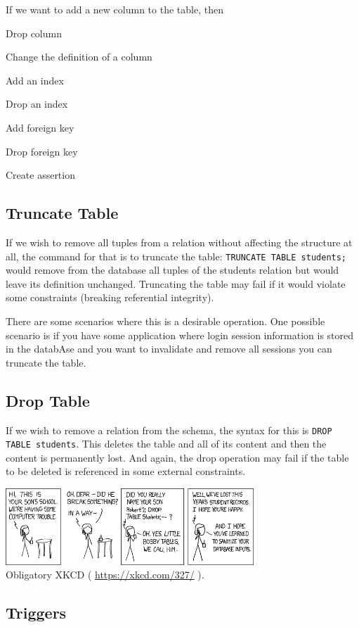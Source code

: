 If we want to add a new column to the table, then 

Drop column

Change the definition of a column

Add an index

Drop an index

Add foreign key

Drop foreign key

Create assertion 


\subsection*{Truncate Table}

If we wish to remove all tuples from a relation without affecting the structure at all, the command for that is to truncate the table: \texttt{TRUNCATE TABLE students;} would remove from the database all tuples of the students relation but would leave its definition unchanged. Truncating the table may fail if it would violate some constraints (breaking referential integrity).

There are some scenarios where this is a desirable operation. One possible scenario is if you have some application where login session information is stored in the databAse and you want to invalidate and remove all sessions you can truncate the table.

\subsection*{Drop Table}

If we wish to remove a relation from the schema, the syntax for this is \texttt{DROP TABLE students}. This deletes the table and all of its content and then the content is permanently lost. And again, the drop operation may fail if the table to be deleted is referenced in some external constraints.

\begin{center}
\includegraphics[width=0.7\textwidth]{images/exploits_of_a_mom}\\
Obligatory XKCD ( \url{https://xkcd.com/327/} ).
\end{center}

\subsection*{Triggers}




